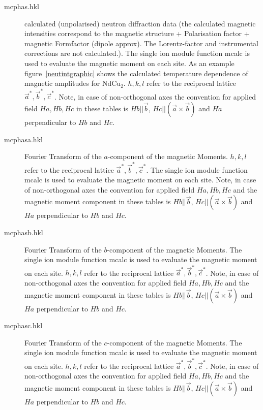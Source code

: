 \begin{description}
\item [\prg mcphas.hkl]    calculated (unpolarised) neutron diffraction data (the calculated magnetic intensities
    correspond to the magnetic structure + Polarisation factor + magnetic Formfactor (dipole approx). The
    Lorentz-factor  and  instrumental corrections are not calculated.). The single ion module function
    {\prg mcalc} is used to evaluate the magnetic moment on each site.
    As an example figure~\ref{neutintgraphic}
    shows the calculated temperature dependence of magnetic amplitudes for NdCu$_2$.
                           $h,k,l$ refer to the reciprocal lattice $\vec a^*,\vec b^*,\vec c^*$.
                            Note, in case of non-orthogonal axes the convention for applied field $Ha, Hb,Hc$ 
                             in these tables 
                            is $Hb||\vec b$, $Hc||(\vec a \times \vec b)$ and $Ha$ perpendicular to $Hb$ and $Hc$.
    
\item [\prg mcphasa.hkl]    Fourier Transform of the $a$-component of the magnetic Moments.
                           $h,k,l$ refer to the reciprocal lattice $\vec a^*,\vec b^*,\vec c^*$. The single ion module function
    {\prg mcalc} is used to evaluate the magnetic moment on each site.
                            Note, in case of non-orthogonal axes the convention for applied field $Ha, Hb,Hc$ and
                            the magnetic moment component in these tables 
                            is $Hb||\vec b$, $Hc||(\vec a \times \vec b)$ and $Ha$ perpendicular to $Hb$ and $Hc$.
\item [\prg mcphasb.hkl]    Fourier Transform of the $b$-component of the magnetic Moments. The single ion module function
    {\prg mcalc} is used to evaluate the magnetic moment on each site. 
                           $h,k,l$ refer to the reciprocal lattice $\vec a^*,\vec b^*,\vec c^*$.
                            Note, in case of non-orthogonal axes the convention for applied field $Ha, Hb,Hc$ and
                            the magnetic moment component in these tables 
                            is $Hb||\vec b$, $Hc||(\vec a \times \vec b)$ and $Ha$ perpendicular to $Hb$ and $Hc$.
\item [\prg mcphasc.hkl]    Fourier Transform of the $c$-component of the magnetic Moments. The single ion module function
    {\prg mcalc} is used to evaluate the magnetic moment on each site.
                           $h,k,l$ refer to the reciprocal lattice $\vec a^*,\vec b^*,\vec c^*$.
                            Note, in case of non-orthogonal axes the convention for applied field $Ha, Hb,Hc$ and
                            the magnetic moment component in these tables 
                            is $Hb||\vec b$, $Hc||(\vec a \times \vec b)$ and $Ha$ perpendicular to $Hb$ and $Hc$.
\end{description} 


